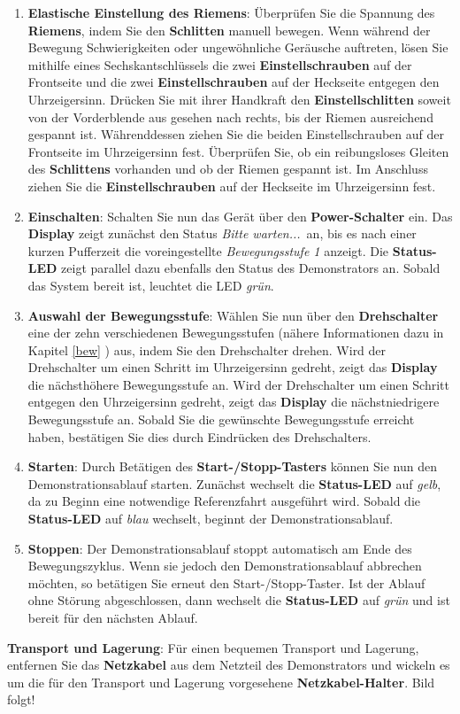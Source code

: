 \begin{enumerate} \label{STU}

	\item \textbf{Elastische Einstellung des Riemens}: Überprüfen Sie die Spannung des \textbf{Riemens}, indem Sie den \textbf{Schlitten} manuell bewegen. Wenn während der Bewegung Schwierigkeiten oder ungewöhnliche Geräusche auftreten, lösen Sie mithilfe eines Sechskantschlüssels die zwei \textbf{Einstellschrauben} auf der Frontseite und die zwei \textbf{Einstellschrauben} auf der Heckseite entgegen den Uhrzeigersinn. Drücken Sie mit ihrer Handkraft den \textbf{Einstellschlitten} soweit von der Vorderblende aus gesehen nach rechts, bis der Riemen ausreichend gespannt ist. Währenddessen ziehen Sie die beiden Einstellschrauben auf der Frontseite im Uhrzeigersinn fest. Überprüfen Sie, ob ein reibungsloses Gleiten des \textbf{Schlittens} vorhanden und ob der Riemen gespannt ist. Im Anschluss ziehen Sie die \textbf{Einstellschrauben} auf der Heckseite im Uhrzeigersinn fest. 
	
	\item \textbf{Einschalten}: Schalten Sie nun das Gerät über den \textbf{Power-Schalter} ein. Das \textbf{Display} zeigt zunächst den Status \glqq \textit{Bitte warten...}\grqq \ an, bis es nach einer kurzen Pufferzeit die voreingestellte \textit{\glqq Bewegungsstufe 1\grqq} anzeigt.
	Die \textbf{Status-LED} zeigt parallel dazu ebenfalls den Status des Demonstrators an. Sobald das System bereit ist, leuchtet die LED \textit{grün}.
	
	\item \textbf{Auswahl der Bewegungsstufe}: Wählen Sie nun über den \textbf{Drehschalter} eine der zehn verschiedenen Bewegungsstufen (nähere Informationen dazu in Kapitel \ref{bew} ) aus, indem Sie den Drehschalter drehen. Wird der Drehschalter um einen Schritt im Uhrzeigersinn gedreht, zeigt das \textbf{Display} die nächsthöhere Bewegungsstufe an. Wird der Drehschalter um einen Schritt entgegen den Uhrzeigersinn gedreht, zeigt das \textbf{Display} die nächstniedrigere Bewegungsstufe an. Sobald Sie die gewünschte Bewegungsstufe erreicht haben, bestätigen Sie dies durch Eindrücken des Drehschalters.	
	
	\item \textbf{Starten}: Durch Betätigen des \textbf{Start-/Stopp-Tasters} können Sie nun den Demonstrationsablauf starten. Zunächst wechselt die \textbf{Status-LED} auf \textit{gelb}, da zu Beginn eine notwendige Referenzfahrt ausgeführt wird. Sobald die \textbf{Status-LED} auf \textit{blau} wechselt, beginnt der Demonstrationsablauf.
	
	\item \textbf{Stoppen}: Der Demonstrationsablauf stoppt automatisch am Ende des Bewegungszyklus. Wenn sie jedoch den Demonstrationsablauf abbrechen möchten, so betätigen Sie erneut den Start-/Stopp-Taster. Ist der Ablauf ohne Störung abgeschlossen, dann wechselt die \textbf{Status-LED} auf \textit{grün} und ist bereit für den nächsten Ablauf.
\end{enumerate}

\begin{itemize}
\textbf{Transport und Lagerung}: Für einen bequemen Transport und Lagerung, entfernen Sie das \textbf{Netzkabel} aus dem Netzteil des Demonstrators und wickeln es um die für den Transport und Lagerung vorgesehene \textbf{Netzkabel-Halter}. Bild folgt!
\end{itemize}

